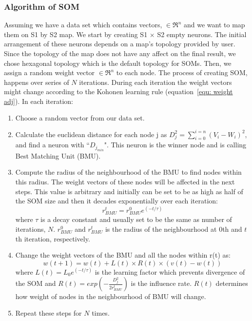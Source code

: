  \subsubsection{Algorithm of SOM} 
 \label{sec: algorithm}
     Assuming we have a data set which contains vectors,  $\in \Re^n$ and we want to map them on S1 by S2 map. 
     We start by creating S1 $\times$ S2 empty neurons. 
     The initial arrangement of these neurons depends on a map's topology provided by user.
     Since the topology of the map does not have any affect on the final result, we chose hexagonal topology which is the default topology for SOMs.
     Then, we assign a random weight vector  $\in \Re^n$ to each node.
     The process of creating SOM, happens over series of $N$ iterations. 
     During each iteration the weight vectors might change according to the Kohonen learning rule (equation~\ref{equ: weight adj}). 
      In each iteration:
     \begin{enumerate}
        \item Choose a random vector from our data set.
        \item Calculate the euclidean distance for each node j as  $D_j^2= \sum_{i=0}^{i=n} (V_i - W_i)^2$, and find a neuron with ``$D_{j_{min}}$". This neuron is the winner node and is calling Best Matching Unit (BMU). 
        \item  Compute the radius of the neighbourhood of the BMU to find nodes within this radius. The weight vectors of these nodes will be affected in the next steps. This value is arbitrary and initially can be set to be as high as half of the SOM size and then it decades exponentially over each iteration:
        \begin{equation}
            r^t_{BMU} = r^0_{BMU}e^{(-t/\tau)}
        \end{equation}
        where $\tau$ is a decay constant and usually set to be the same as number of iterations, $N$. $r^0_{BMU}$ and $r^t_{BMU}$ is the radius of the neighbourhood at 0th and $t$th iteration, respectively. 
        \item Change the weight vectors of the BMU and all the nodes within r(t) as:
        \begin{equation}
            \label{equ: weight adj}
            w(t+1)=w(t)+L(t) \times R(t) \times(v(t)-w(t))
        \end{equation}
        where $L(t) = L_0 e^{(-t/\tau)}$ is the learning factor which prevents divergence of the SOM and $R(t)=exp(-\frac{D_j^2}{2r^t_{BMU}})$ is the influence rate. $R(t)$ determines how weight of nodes in the neighbourhood of BMU will change.
        \item  Repeat these steps for $N$ times.
     \end{enumerate}
     
